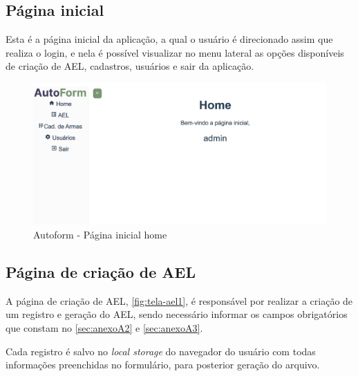 \subsection{Página inicial}
Esta é a página inicial da aplicação, a qual o usuário é direcionado assim que realiza o login, e nela é possível visualizar no menu lateral as opções disponíveis de criação de AEL, cadastros, usuários e sair da aplicação.

\begin{figure}[htb]
    \caption{\label{fig:tela-home}Autoform - Página inicial home}
    \begin{center}
        \includegraphics[scale=0.5]{imagens/home-autoform.png}
    \end{center}
\end{figure}

\subsection{Página de criação de AEL}
A página de criação de AEL, \autoref{fig:tela-ael1}, é responsável por realizar a criação de um registro e geração do AEL, sendo necessário informar os campos obrigatórios que constam no \autoref{sec:anexoA2} e \autoref{sec:anexoA3}.

Cada registro é salvo no \textit{local storage} do navegador do usuário com todas informações preenchidas no formulário, para posterior geração do arquivo. 


